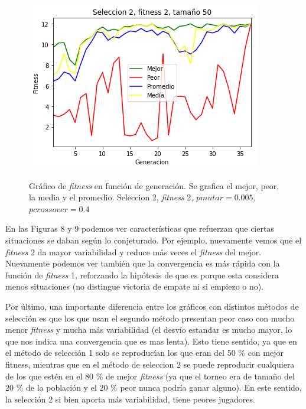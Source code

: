 \documentclass[A4paper,oneside,fleqn,11pt]{article}
\theoremstyle{definition}
\begin{document}
\begin{figure}[H]
	\captionsetup[subfigure]{position=b}
	\centering
		{\includegraphics[width=0.3\linewidth]{s2f2t50.png}}
	\caption{Gráfico de \textit{fitness} en función de generación. Se grafica el mejor, peor, la media y el promedio. Seleccion 2, \textit{fitness} 2, $pmutar=0.005$, $ pcrossover=0.4$}
\end{figure}

En las Figuras 8 y 9 podemos ver características que refuerzan que ciertas situaciones se daban según lo conjeturado. Por ejemplo, nuevamente vemos que el \textit{fitness} 2 da mayor variabilidad y reduce más veces el \textit{fitness} del mejor. Nuevamente podemos ver también que la convergencia es más rápida con la función de \textit{fitness} 1, reforzando la hipótesis de que es porque esta considera menos situaciones (no distingue victoria de empate ni si empiezo o no).

Por último, una importante diferencia entre los gráficos con distintos métodos de selección es que los que usan el segundo método presentan peor caso con mucho menor \textit{fitness} y mucha más variabilidad (el desvío estandar es mucho mayor, lo que nos indica una convergencia que es mas lenta). Esto tiene sentido, ya que en el método de selección 1 solo se reproducían los que eran del 50 \% con mejor fitness, mientras que en el método de seleccion 2 se puede reproducir cualquiera de los que estén en el 80 \% de mejor \textit{fitness} (ya que el torneo era de tamaño del 20 \% de la población y el 20 \% peor nunca podría ganar alguno). En este sentido, la selección 2 si bien aporta más variabilidad, tiene peores jugadores.
\end{document}
